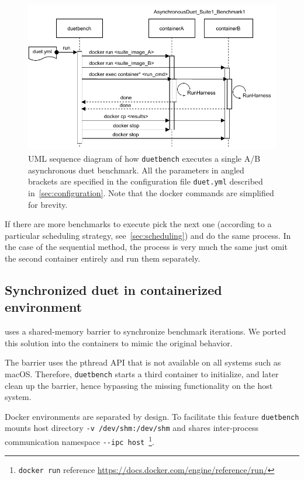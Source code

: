 \begin{figure}
    \centering
    \includegraphics[width=\linewidth]{./figures/duetbench-sequence.drawio.pdf}
    \caption{
        UML sequence diagram of how \lstinline{duetbench} executes a single A/B asynchronous duet benchmark.
        All the parameters in angled brackets are specified in the configuration file \lstinline{duet.yml} described in~\cref{sec:configuration}.
        Note that the docker commands are simplified for brevity.
    }
    \label{fig:duetbench_sequence}
\end{figure}

If there are more benchmarks to execute pick the next one (according to a particular scheduling strategy, see~\cref{sec:scheduling}) and do the same process.
In the case of the sequential method, the process is very much the same just omit the second container entirely and run them separately.

\subsection{Synchronized duet in containerized environment}
\label{sec:sync_duet_impl}

\citet{bulej2020duet} uses a \mbox{shared-memory} barrier to synchronize benchmark iterations.
We ported this solution into the containers to mimic the original behavior.

The barrier uses the pthread API that is not available on all systems such as macOS.
Therefore, \lstinline{duetbench} starts a third container to initialize, and later clean up the barrier, hence bypassing the missing functionality on the host system.

Docker environments are separated by design.
To facilitate this feature \lstinline{duetbench} mounts host directory \lstinline{-v /dev/shm:/dev/shm} and shares \mbox{inter-process} communication namespace \lstinline{--ipc host}~\footnote{\lstinline{docker run} reference \url{https://docs.docker.com/engine/reference/run/}}.

